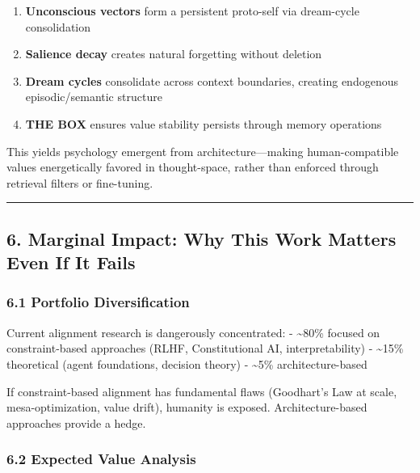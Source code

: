 \documentclass[
]{article}
\providecommand{\tightlist}{%
  \setlength{\itemsep}{0pt}\setlength{\parskip}{0pt}}
\begin{document}
\begin{enumerate}
\def\labelenumi{\arabic{enumi}.}
\tightlist
\item
  \textbf{Unconscious vectors} form a persistent proto-self via
  dream-cycle consolidation
\item
  \textbf{Salience decay} creates natural forgetting without deletion
\item
  \textbf{Dream cycles} consolidate across context boundaries, creating
  endogenous episodic/semantic structure
\item
  \textbf{THE BOX} ensures value stability persists through memory
  operations
\end{enumerate}

This yields psychology emergent from architecture---making
human-compatible values energetically favored in thought-space, rather
than enforced through retrieval filters or fine-tuning.

\begin{center}\rule{0.5\linewidth}{0.5pt}\end{center}

\hypertarget{marginal-impact-why-this-work-matters-even-if-it-fails}{%
\subsection{6. Marginal Impact: Why This Work Matters Even If It
Fails}\label{marginal-impact-why-this-work-matters-even-if-it-fails}}

\hypertarget{portfolio-diversification}{%
\subsubsection{6.1 Portfolio
Diversification}\label{portfolio-diversification}}

Current alignment research is dangerously concentrated: -
\textasciitilde80\% focused on constraint-based approaches (RLHF,
Constitutional AI, interpretability) - \textasciitilde15\% theoretical
(agent foundations, decision theory) - \textasciitilde5\%
architecture-based

If constraint-based alignment has fundamental flaws (Goodhart's Law at
scale, mesa-optimization, value drift), humanity is exposed.
Architecture-based approaches provide a hedge.

\hypertarget{expected-value-analysis}{%
\subsubsection{6.2 Expected Value
Analysis}\label{expected-value-analysis}}
\end{document}
